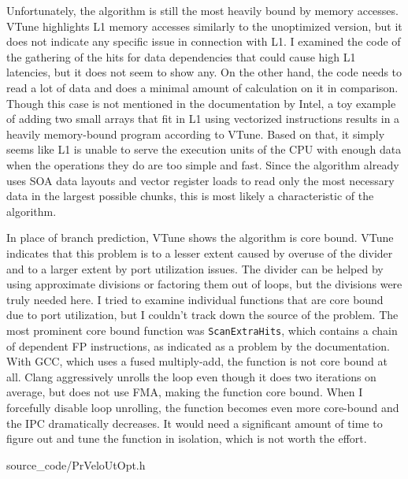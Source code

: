 \documentclass[12pt]{article}
\newcommand{\code}[1]{\texttt{#1}}
\begin{document}
Unfortunately, the algorithm is still the most heavily bound by memory accesses. VTune highlights L1 memory accesses similarly to the unoptimized version, but it does not indicate any specific issue in connection with L1. I examined the code of the gathering of the hits for data dependencies that could cause high L1 latencies, but it does not seem to show any. On the other hand, the code needs to read a lot of data and does a minimal amount of calculation on it in comparison. Though this case is not mentioned in the documentation by Intel, a toy example of adding two small arrays that fit in L1 using vectorized instructions results in a heavily memory-bound program according to VTune. Based on that, it simply seems like L1 is unable to serve the execution units of the CPU with enough data when the operations they do are too simple and fast. Since the algorithm already uses SOA data layouts and vector register loads to read only the most necessary data in the largest possible chunks, this is most likely a characteristic of the algorithm.


\vspace{1pc}

In place of branch prediction, VTune shows the algorithm is core bound. VTune indicates that this problem is to a lesser extent caused by overuse of the divider and to a larger extent by port utilization issues. The divider can be helped by using approximate divisions or factoring them out of loops, but the divisions were truly needed here. I tried to examine individual functions that are core bound due to port utilization, but I couldn't track down the source of the problem. The most prominent core bound function was \code{ScanExtraHits}, which contains a chain of dependent FP instructions, as indicated as a problem by the documentation\cite{intel_vtune_docs}. With GCC, which uses a fused multiply-add, the function is not core bound at all. Clang aggressively unrolls the loop even though it does two iterations on average, but does not use FMA, making the function core bound. When I forcefully disable loop unrolling, the function becomes even more core-bound and the IPC dramatically decreases. It would need a significant amount of time to figure out and tune the function in isolation, which is not worth the effort.


	{source_code/PrVeloUtOpt.h}
\end{document}

